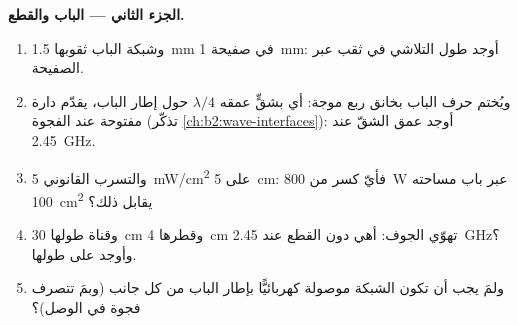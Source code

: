 \begin{problem}
\medskip
\noindent\textbf{الجزء الثاني --- الباب والقطع.}
\begin{enumerate}[resume]
  \item وشبكة الباب ثقوبها \qty{1.5}{mm} في صفيحة \qty{1}{mm}: أوجد طول
        التلاشي في ثقب   عبر الصفيحة.
  \item ويُختم حرف الباب بخانق ربع موجة: أي بشقٍّ
        عمقه $\lambda/4$ حول إطار الباب، يقدّم دارة مفتوحة
        عند الفجوة (تذكّر \cref{ch:b2:wave-interfaces}): أوجد عمق
        الشقّ عند \qty{2.45}{GHz}.
  \item والتسرب القانوني \qty{5}{mW/cm^2} على \qty{5}{cm}: فأيّ كسر من
        \qty{800}{W} عبر باب مساحته \qty{100}{cm^2} يقابل ذلك؟
  \item وقناة طولها \qty{30}{cm} وقطرها \qty{4}{cm} تهوّي الجوف: أهي
        دون القطع عند \qty{2.45}{GHz}؟ وأوجد  على طولها.
  \item ولمَ يجب أن تكون الشبكة موصولة كهربائيًّا بإطار الباب من كل
        جانب (وبمَ تتصرف فجوة في الوصل)؟
\end{enumerate}


\end{problem}
